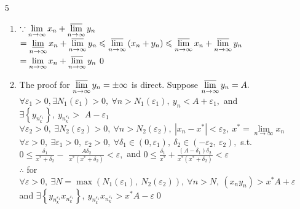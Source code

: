 \begin{enumerate}[1]
\begin{enumerate}[(1)]
\end{enumerate}

	\item[5]

\begin{enumerate}[(1)]
	\item 
	\(\because \lim \limits_{n \rightarrow \infty} x_{n}+\varlimsup \limits_{n \rightarrow \infty} y_{n} \)\\
	\(= \varliminf \limits_{n \rightarrow \infty} x_{n}+\varlimsup \limits_{n \rightarrow \infty} y_{n} \leqslant \varlimsup \limits_{n \rightarrow \infty}\left(x_{n}+y_{n}\right) \leqslant \varlimsup \limits_{n \rightarrow \infty} x_{n}+\varlimsup \limits_{n \rightarrow \infty} y_{n}\)\\
	\(=\lim \limits_{n \rightarrow \infty} x_{n}+ \varlimsup \limits_{n \rightarrow \infty} y_{n}\)\qed

	\item 
	The proof for \(\varlimsup \limits_{n \rightarrow \infty} y_{n}=\pm \infty\) is direct. Suppose \(\varlimsup \limits_{n \rightarrow \infty} y_{n}=A .\)\\
	\(\forall \varepsilon_{1}>0, \exists N_{1}\left(\varepsilon_{1}\right)>0,\  \forall n>N_{1}\left(\varepsilon_{1}\right),\  y_{n}<A+\varepsilon_{1},\) and \(\exists\left\{y_{n_{k}^{\varepsilon_{1}}}\right\},\  y_{n_{k}^{\varepsilon_{1}}}>\)	\(A-\varepsilon_{1}\)\\
	\(\forall \varepsilon_{2}>0,\ \exists N_{2}\left(\varepsilon_{2}\right)>0,\  \forall n>N_{2}\left(\varepsilon_{2}\right),\ \left|x_{n}-x^{*}\right|<\varepsilon_{2},\  x^{*}=\lim \limits_{n \rightarrow \infty} x_{n}\)\\
	\(\forall \varepsilon>0,\ \exists \varepsilon_{1}>0,\  \varepsilon_{2}>0,\ \forall \delta_{1} \in\left(0, \varepsilon_{1}\right),\  \delta_{2} \in\left(-\varepsilon_{2}, \ \varepsilon_{2}\right),\) s.t. \(0 \leqslant \frac{\delta_{1}}{x^{*}+\delta_{2}}-\)
	\(\frac{A \delta_{2}}{x^{*}\left(x^{*}+\delta_{2}\right)}<\varepsilon,\) and \(0 \leqslant \frac{\delta_{1}}{x^{*}}+\frac{\left(A-\delta_{1}\right) \delta_{2}}{x^{*}\left(x^{*}+\delta_{2}\right)}<\varepsilon\)\\
	\(\therefore\) for \(\forall \varepsilon>0,\  \exists N=\max \left(N_{1}\left(\varepsilon_{1}\right),\  N_{2}\left(\varepsilon_{2}\right)\right),\  \forall n>N,\ \left(x_{n} y_{n}\right)>x^{*} A+\varepsilon\) \\
	and \(\exists\left\{y_{n_{k}^{\varepsilon_{1}}} x_{n_{k}^{\varepsilon_{1}}}\right\},\  y_{n_{k}^{\varepsilon_{1}}} x_{n_{k}^{\varepsilon_{1}}}>x^{*} A-\varepsilon\)\qed
\end{enumerate}


\end{enumerate}
